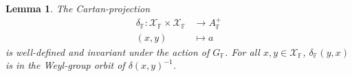 \documentclass[12pt]{amsart}
\newcommand{\F}{\mathbb{F} }
\newcommand{\X}{\mathcal{X}}
\newcommand{\K}{\mathbb{K}}
\newcommand{\ApF}{A_\F^+}
\newcommand{\KPhi}{\vphantom{\Phi}_{\K}\Phi}
\newcommand{\KW}{\vphantom{W}_{\K}W}
\numberwithin{equation}{section}
\newtheorem{lemma}[theorem]{Lemma}
\theoremstyle{remark} %
\begin{document}
\begin{lemma}\label{lem:Cartan_projection}
	The Cartan-projection 
	\begin{align*}
		\delta_\F \colon \X_\F \times \X_\F & \to \ApF\\
		(x,y) &\mapsto a
	\end{align*}
	is well-defined and invariant under the action of $G_\F$. For all $x,y \in \X_\F$, $\delta_\F(y,x)$ is in the Weyl-group orbit of $\delta(x,y)^{-1}$.
\end{lemma} 
\end{document}
